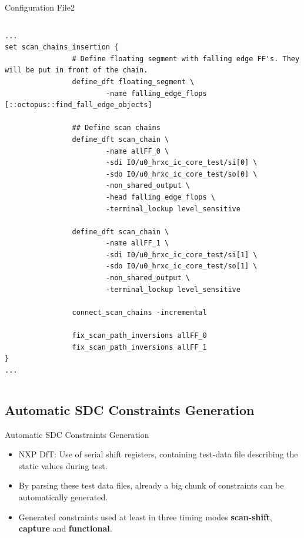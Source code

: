 \documentclass{beamer}
\begin{document}
\begin{frame}{Configuration File}{2}
\begin{columns}
\begin{column}{1.1\textwidth}
\tiny
\begin{verbatim}
...
set scan_chains_insertion {
                # Define floating segment with falling edge FF's. They will be put in front of the chain.
                define_dft floating_segment \
                        -name falling_edge_flops [::octopus::find_fall_edge_objects]

                ## Define scan chains
                define_dft scan_chain \
                        -name allFF_0 \
                        -sdi I0/u0_hrxc_ic_core_test/si[0] \
                        -sdo I0/u0_hrxc_ic_core_test/so[0] \
                        -non_shared_output \
                        -head falling_edge_flops \
                        -terminal_lockup level_sensitive

                define_dft scan_chain \
                        -name allFF_1 \
                        -sdi I0/u0_hrxc_ic_core_test/si[1] \
                        -sdo I0/u0_hrxc_ic_core_test/so[1] \
                        -non_shared_output \
                        -terminal_lockup level_sensitive

                connect_scan_chains -incremental

                fix_scan_path_inversions allFF_0
                fix_scan_path_inversions allFF_1
}
...
\end{verbatim}
\end{column}
\end{columns}
\end{frame}

\subsection{Automatic SDC Constraints Generation}
\begin{frame}{Automatic SDC Constraints Generation}
	\begin{itemize}[<+->]
	 \item NXP DfT: Use of serial shift registers, containing test-data file describing the static values during test.
	 \item By parsing these test data files, already a big chunk of constraints can be automatically generated.
	 \item Generated constraints used at least in three timing modes \textbf{scan-shift}, \textbf{capture} and \textbf{functional}.
	\end{itemize}
\end{frame}
\end{document}
